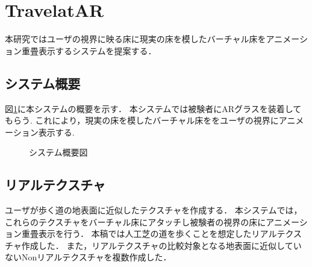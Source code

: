 \documentclass[dvipdfmx]{jsarticle}
\begin{document}
\section{TravelatAR}
本研究ではユーザの視界に映る床に現実の床を模したバーチャル床をアニメーション重畳表示するシステムを提案する．


\subsection{システム概要}
図\ref{fig:gaiyo}に本システムの概要を示す．
本システムでは被験者にARグラスを装着してもらう.
これにより，現実の床を模したバーチャル床ををユーザの視界にアニメーション表示する.
\begin{figure}[t]
    \centering
    \caption{システム概要図}
    \label{fig:gaiyo}
\end{figure}

\subsection{リアルテクスチャ}
ユーザが歩く道の地表面に近似したテクスチャを作成する．
本システムでは，これらのテクスチャをバーチャル床にアタッチし被験者の視界の床にアニメーション重畳表示を行う．
本稿では人工芝の道を歩くことを想定したリアルテクスチャ作成した．
また，リアルテクスチャの比較対象となる地表面に近似していないNonリアルテクスチャを複数作成した．
\end{document}
